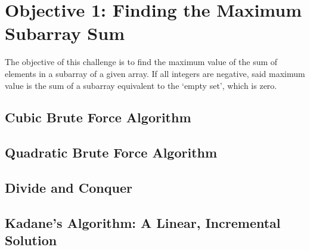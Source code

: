 \chapter{Objective 1: Finding the Maximum Subarray Sum}
The objective of this challenge is to find the maximum value of the sum of
elements in a subarray of a given array. If all integers are negative, said
maximum value is the sum of a subarray equivalent to the `empty set', which is
zero.

\section{Cubic Brute Force Algorithm}


\section{Quadratic Brute Force Algorithm}


\section{Divide and Conquer}


\section{Kadane's Algorithm: A Linear, Incremental Solution}

